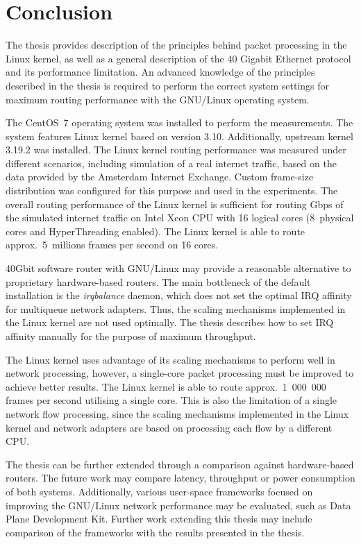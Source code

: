 
\chapter{Conclusion}\label{chap:conclusion}
The thesis provides description of the principles behind packet processing in the Linux kernel, as well as
a general description of the 40 Gigabit Ethernet protocol and its performance limitation.
An advanced knowledge of the principles described in the thesis is required to
perform the correct system settings for maximum routing performance with the GNU/Linux operating system.

The CentOS~7 operating system was installed to perform the measurements.
The system features Linux kernel based on version 3.10.
Additionally, upstream kernel 3.19.2 was installed.
The Linux kernel routing performance was measured under different scenarios, including
simulation of a real internet traffic, based on the data provided by the Amsterdam Internet Exchange.
Custom frame-size distribution was configured for this purpose and used in the experiments.
The overall routing performance of the Linux kernel is sufficient for routing %
Gbps of the simulated internet traffic on Intel Xeon CPU with 16 logical cores (8~physical cores and HyperThreading enabled).
The Linux kernel is able to route approx.~5~millions frames per second on 16 cores.

40Gbit software router with GNU/Linux may provide a reasonable alternative to proprietary hardware-based routers.
The main bottleneck of the default installation is the {\it{irqbalance}} daemon, which
does not set the optimal IRQ affinity for multiqueue network adapters.
Thus, the scaling mechanisms implemented in the Linux kernel are not used optimally.
The thesis describes how to set IRQ affinity manually for the purpose of maximum throughput.

The Linux kernel uses advantage of its scaling mechanisms to perform well in network processing,
however, a single-core packet processing must be improved to achieve better results.
The Linux kernel is able to route approx.~1~000~000 %
frames per second utilising a single core.
This is also the limitation of a single network flow processing,
since the scaling mechanisms implemented in the Linux kernel and network adapters
are based on processing each flow by a different CPU.

The thesis can be further extended through a comparison against hardware-based routers.
The future work may compare latency, throughput or power consumption of both systems.
Additionally, various user-space frameworks focused on improving the GNU/Linux network performance may be evaluated,
such as Data Plane Development Kit.
Further work extending this thesis may include comparison of
the frameworks with the results presented in the thesis.
